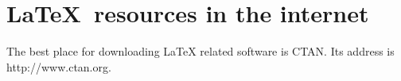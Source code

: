 \documentclass{article}
\begin{document}
	\section{\sffamily\LaTeX\ resources in the internet}
	The best place for downloading LaTeX related software is CTAN.
	Its address is \ttfamily http://www.ctan.org\rmfamily.
\end{document}
